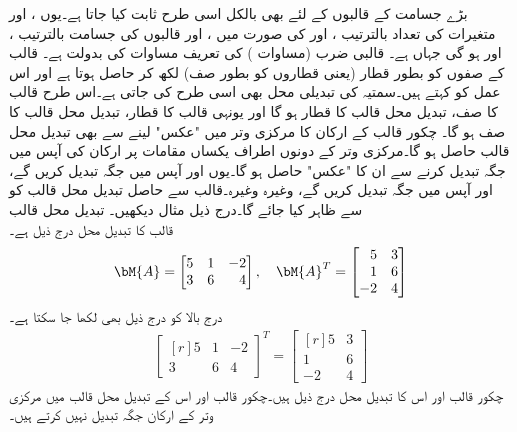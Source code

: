 بڑے جسامت کے قالبوں کے لئے بھی  بالکل اسی طرح ثابت کیا جاتا ہے۔یوں ،  اور  متغیرات کی تعداد بالترتیب ،  اور  کی صورت میں ،  اور  قالبوں کی جسامت بالترتیب ،  اور  ہو گی جہاں  ہے۔  قالبی ضرب (مساوات )  کی تعریف مساوات  کی بدولت ہے۔
قالب کے صفوں کو بطور قطار (یعنی قطاروں کو بطور صف) لکھ کر  حاصل ہوتا ہے اور اس عمل کو  کہتے ہیں۔سمتیہ کی تبدیلی محل بھی اسی طرح کی جاتی ہے۔اس طرح قالب کا صف، تبدیل محل قالب کا قطار ہو گا اور یونہی قالب کا قطار، تبدیل محل قالب کا صف ہو گا۔ چکور قالب کے ارکان کا مرکزی وتر میں "عکس" لینے سے بھی تبدیل محل قالب حاصل ہو گا۔مرکزی وتر کے دونوں اطراف یکساں مقامات پر ارکان کی آپس میں جگہ تبدیل کرنے سے ان کا "عکس" حاصل ہو گا۔یوں  اور  آپس میں جگہ تبدیل کریں گے،  اور  آپس میں جگہ تبدیل کریں گے، وغیرہ وغیرہ۔قالب  سے حاصل تبدیل محل قالب کو  سے ظاہر کیا جائے گا۔درج ذیل مثال دیکھیں۔
\quad تبدیل محل قالب\\
قالب  کا تبدیل محل  درج ذیل ہے۔
\begin{align*}
\bM{A}=\begin{bmatrix*}[r] 5&1&-2\\3&6&4  \end{bmatrix*}, \quad \bM{A}^T=\begin{bmatrix*}[r] 5&3\\1&6\\-2&4 \end{bmatrix*}
\end{align*}
درج بالا کو درج ذیل بھی لکھا جا سکتا ہے۔
\begin{align*}
\begin{bmatrix*}[r] 5&1&-2\\3&6&4  \end{bmatrix*}^T=\begin{bmatrix*}[r] 5&3\\1&6\\-2&4 \end{bmatrix*}
\end{align*}
چکور قالب اور اس کا تبدیل محل درج ذیل ہیں۔چکور قالب اور اس کے تبدیل محل قالب میں مرکزی وتر کے ارکان جگہ تبدیل نہیں کرتے ہیں۔
